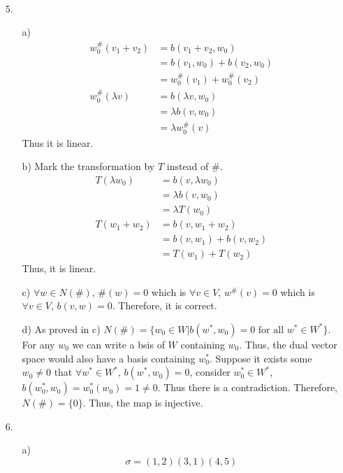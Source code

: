 \documentclass{article}
\begin{document}
\begin{itemize}
\begin{itemize}
\begin{align*}
        \end{align*}
    \end{itemize}
    \item [5.]
    \begin{itemize}
        \item [a)]
        \begin{align*}
            w_0^\#(v_1+v_2) &= b(v_1+v_2,w_0)\\
            &= b(v_1,w_0)+b(v_2,w_0)\\
            &= w_0^\#(v_1)+w_0^\#(v_2)\\
            w_0^\#(\lambda v)&= b(\lambda v,w_0)\\
            &= \lambda b(v,w_0)\\
            &=\lambda w_0^\#(v)
        \end{align*}
        Thus it is linear.
        \item [b)]
        Mark the transformation by \(T\) instead of \(\#\).\\
        \begin{align*}
            T(\lambda w_0)&=b(v,\lambda w_0)\\
            &=\lambda b(v,w_0)\\
            &=\lambda T(w_0)\\
            T(w_1+w_2)&=b(v,w_1+w_2)\\
            &=b(v,w_1)+b(v,w_2)\\
            &=T(w_1)+T(w_2)
        \end{align*}
        Thus, it is linear.
        \item [c)]
        \(\forall w\in N(\#)\), \(\#(w)=0\) which is \(\forall v\in V\), \(w^\#(v)=0\) which is \(\forall v \in V\), \(b(v,w)=0\). Therefore, it is correct.
        \item [d)]
        As proved in c) \(N(\#)=\{w_0\in W|b(w^*,w_0)=0 \text{ for all } w^*\in W^*\}\). For any \(w_0\) we can write a bsis of \(W\) containing \(w_0\). Thus, the dual vector space would also have a basis containing \(w_0^*\).
        Suppose it exists some \(w_0\neq 0\) that \(\forall w^*\in W^*\), \(b(w^*,w_0)=0\), consider \(w_0^*\in W^*\), \(b(w_0^*,w_0)=w_0^*(w_0)=1\neq 0\). Thus there is a contradiction. Therefore, \(N(\#)=\{0\}\). Thus, the map is injective.
    \end{itemize}
    \item [6.]
    \begin{itemize}
        \item [a)] \[\sigma = (1,2)(3,1)(4,5)\]

\end{itemize}
\end{itemize}
\end{document}
